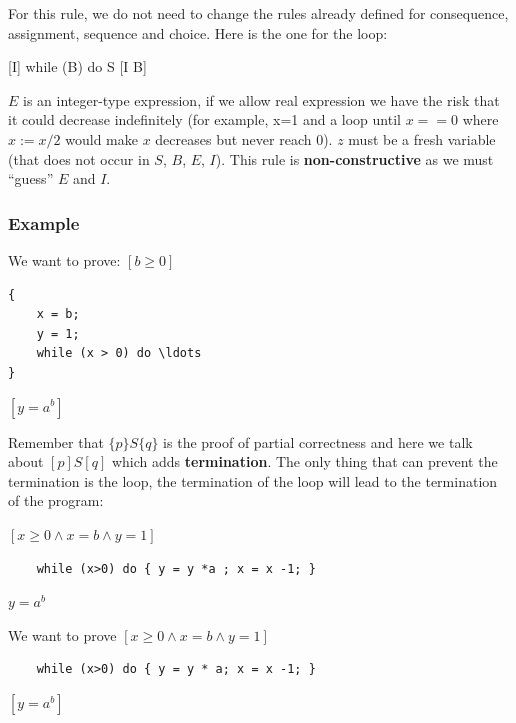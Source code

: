 \documentclass[12pt, a4paper]{book}
\begin{document}
    For this rule, we do not need to change the rules already defined for
    consequence, assignment, sequence and choice. Here is the one for the
    loop:

    \begin{framed}
        {[I] \textrm{ while } (B) do S [I \land\lnot{} B]}
    \end{framed}

    $E$ is an integer-type expression, if we allow real expression we have the
    risk that it could decrease indefinitely (for example, x=1 and a loop until
    $x == 0$ where $x:=x/2$ would make $x$ decreases but never reach 0). $z$
    must be a fresh variable (that does not occur in $S$, $B$, $E$, $I$). This
    rule is \textbf{non-constructive} as we must \enquote{guess} $E$ and $I$.

    \subsubsection{Example}

    We want to prove:
    $[b \ge 0]$
\begin{lstlisting}
{
    x = b;
    y = 1;
    while (x > 0) do \ldots
}
\end{lstlisting}
    $[y = a^{b}]$

    \bigskip

    Remember that $\{ p \} S \{ q \}$ is the proof of partial correctness and
    here we talk about $[p] S [q]$ which adds \textbf{termination}. The only
    thing that can prevent the termination is the loop, the termination of the
    loop will lead to the termination of the program:

    $[ x \ge 0 \land x =b \land y=1]$
\begin{lstlisting}
    while (x>0) do { y = y *a ; x = x -1; }
\end{lstlisting}
    $y = {a}^{b}$

    \bigskip

    We want to prove
    $[x \ge 0 \land x =b \land y =1]$
\begin{lstlisting}
    while (x>0) do { y = y * a; x = x -1; }
\end{lstlisting}
    $[y = {a}^{b}]$
\end{document}
